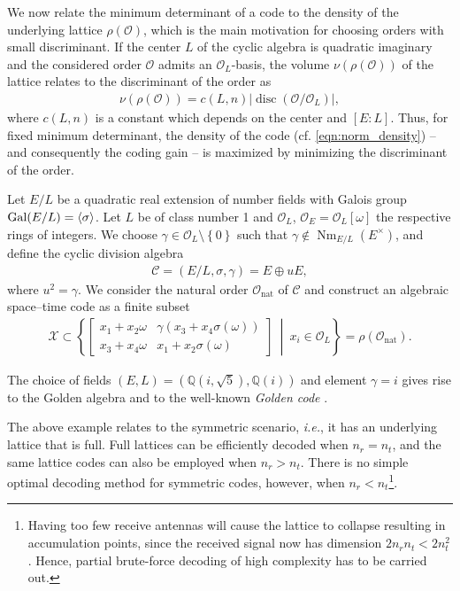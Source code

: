 \documentclass[smallextended]{svjour3}
\newcommand{\Q}{\mathbb{Q}}
\newcommand{\mce}{\Or_{E}}
\newcommand{\mcl}{\Or_{L}}
\newcommand{\mcc}{\mathcal{C}}
\newcommand{\G}{{\rm Gal}}
\newcommand{\Or}{\mathcal{O}}
\DeclareMathOperator{\Nm}{Nm}
\DeclareMathOperator{\disc}{disc}
\begin{document}
We now relate the minimum determinant of a code to the density of the underlying lattice $\rho(\Or)$, which is the main motivation for choosing orders with small discriminant. If the center $L$ of the cyclic algebra is quadratic imaginary and the considered order $\Or$ admits an $\Or_L$-basis, the volume $\nu(\rho(\Or))$ of the lattice relates to the discriminant of the order as \cite{VHLR}
\begin{align}
\label{eqn:density}
	\nu(\rho(\Or)) = c(L,n)\left|\disc(\Or/\Or_L)\right|,
\end{align}
where $c(L,n)$ is a constant which depends on the center and $[E:L]$. Thus, for fixed minimum determinant, the density of the code (cf. \eqref{eqn:norm_density}) -- and consequently the coding gain -- is maximized by minimizing the discriminant of the order.


\begin{example}
\label{exp:golden}
Let $E/L$ be a quadratic real extension of number fields with Galois group $\G(E/L) = \langle \sigma \rangle$. Let $L$ be of class number 1 and  $\mcl$, $\mce = \mcl[\omega]$ the respective rings of integers.
We choose $\gamma \in \Or_L\setminus\left\{0\right\}$ such that $\gamma \notin \Nm_{E/L}(E^\times)$, and define the cyclic division algebra
\begin{align*}
	\mathcal{C} = (E/L,\sigma,\gamma) = E \oplus uE,
\end{align*} 
where $u^2 = \gamma$. We consider the natural order $\Or_\text{nat}$ of $\mcc$ and construct an algebraic space--time code as a finite subset 
\begin{align*}
\mathcal{X} \subset \left\{
\begin{bmatrix} x_1 + x_2\omega  & \gamma(x_3 + x_4\sigma(\omega)) \\ x_3 + x_4\omega & x_1 + x_2\sigma(\omega) \end{bmatrix} \ \middle|\ x_i\in \mcl
\right\}= \rho(\Or_\text{nat}).
\end{align*}
 
The choice of fields $(E,L) = (\Q(i,\sqrt{5}),\Q(i))$ and element $\gamma = i$ gives rise to the Golden algebra and to the well-known \emph{Golden code} \cite{ORBV}. 
\end{example}

The above example relates to the symmetric scenario, \emph{i.e.}, it has an underlying lattice that is full. Full lattices can be efficiently decoded when $n_r = n_t$, and the same lattice codes can also be employed when $n_r > n_t$.  There is no simple optimal decoding method for symmetric codes, however, when $n_r < n_t$\footnote{Having too few receive antennas will cause the lattice to collapse resulting in accumulation points, since the received signal now has dimension $2n_rn_t<2n_t^2$. Hence, partial brute-force decoding of high complexity has to be carried out.}. 
\end{document}
